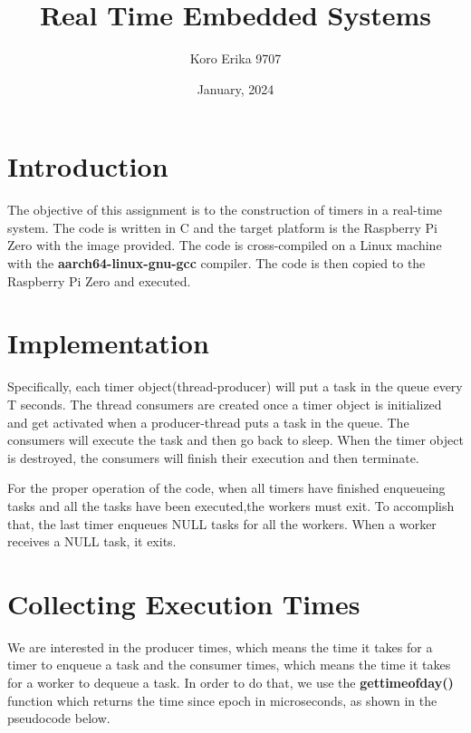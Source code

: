\documentclass[12pt, a4paper]{report}
\title{\Large{\textbf{Real Time Embedded Systems}}}
\author{Koro Erika 9707}
\date{January, 2024}
\begin{document}
    \maketitle
    
    \section*{Introduction}
    The objective of this assignment is to the construction of timers in a real-time system. The code is written in C
    and the target platform is the Raspberry Pi Zero with
    the image provided. The code is cross-compiled on a Linux machine with the \textbf{aarch64-linux-gnu-gcc} compiler.
    The code is then copied to the Raspberry Pi Zero and executed.
    

    \section*{Implementation}
    Specifically, each timer object(thread-producer) will put a task in the queue every T seconds.
    The thread consumers are created once a timer object is initialized and get activated when a producer-thread
    puts a task in the queue. The consumers will execute
    the task and then go back to sleep. When the timer object is destroyed, the consumers will finish their execution and then terminate.

    For the proper operation of the code, when all timers have finished enqueueing tasks and all the tasks have been executed,the workers must exit.
    To accomplish that, the last timer enqueues NULL tasks for all the workers. When a worker receives a NULL task, it exits.

    \section*{Collecting Execution Times}
    We are interested in the producer times, which means the time it takes for a timer to enqueue a task and the consumer times,
    which means the time it takes for a worker to dequeue a task. In order to do that,
    we use the \textbf{gettimeofday()} function which returns the time since epoch in microseconds, as shown in the pseudocode below.
    
\end{document}
